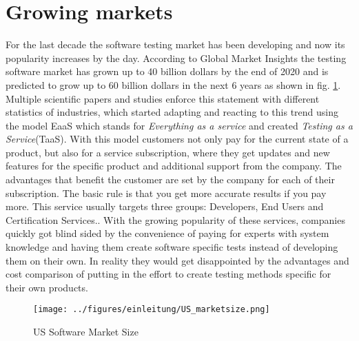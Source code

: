 \section{Growing markets}
For the last decade the software testing market has been developing and now its popularity increases by the day. According to \dq Global Market Insights\dq{} the testing software market has grown up to 40 billion dollars by the end of 2020 and is predicted to grow up to 60 billion dollars in the next 6 years as shown in fig. \ref{US_marketsize_graph}.\cite{GMI}\\
Multiple scientific papers and studies enforce this statement with different statistics of industries, which started adapting and reacting to this trend using the model \dq EaaS\dq{} which stands for \textit{Everything as a service} and created \textit{ Testing as a Service}(TaaS). With this model customers not only pay for the current state of a product, but also for a service subscription, where they get updates and new features for the specific product and additional support from the company. The advantages that benefit the customer are set by the company for each of their subscription. The basic rule is that you get more accurate results if you pay more. This service usually targets three groups: Developers, End Users and Certification Services.\cite{10.1145/1807128.1807153}. With the growing popularity of these services, companies quickly got blind sided by the convenience of paying for experts with system knowledge and having them create software specific tests instead of developing them on their own. In reality they would get disappointed by the advantages and cost comparison of putting in the effort to create testing methods specific for their own products. 
\begin{figure}[!htbp]
	\centering
	\texttt{[image: ../figures/einleitung/US\_marketsize.png]}
	\caption{US Software Market Size\cite{GMI}}
	\label{US_marketsize_graph}
\end{figure}

